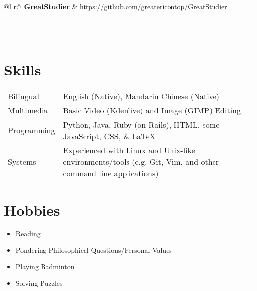 \documentclass[letter, 12pt]{article}
\begin{document}
\begin{tabularx}{\linewidth}{ @{}l r@{} }
    \textbf{GreatStudier} & \hfill \href{https://github.com/greatericontop/GreatStudier}{https://github.com/greatericontop/GreatStudier} \\[3.75pt]
     \\
     \\
     \\
\end{tabularx}


\section{Skills}

\begin{tabularx}{\linewidth}{@{}l X@{}}
    Bilingual &  English (Native), Mandarin Chinese (Native) \\
    Multimedia & Basic Video (Kdenlive) and Image (GIMP) Editing \\
    Programming & Python, Java, Ruby (on Rails), HTML, some JavaScript, CSS, \& \LaTeX \\
    Systems & Experienced with Linux and Unix-like environments/tools (e.g. Git, Vim, and other command line applications) \\
\end{tabularx}

\section{Hobbies}

\begin{itemize}
    \item Reading
    \item Pondering Philosophical Questions/Personal Values
    \item Playing Badminton
    \item Solving Puzzles
\end{itemize}

\vfill
{}
\end{document}
